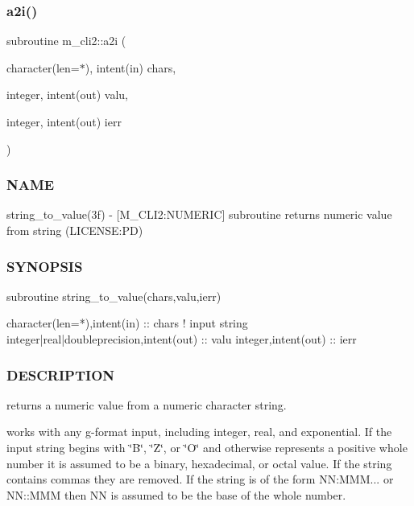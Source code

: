 \subsubsection{\texorpdfstring{a2i()}{a2i()}}
{\footnotesize\ttfamily subroutine m\+\_\+cli2\+::a2i (\begin{DoxyParamCaption}\item[{character(len=$\ast$), intent(in)}]{chars,  }\item[{integer, intent(out)}]{valu,  }\item[{integer, intent(out)}]{ierr }\end{DoxyParamCaption})\hspace{0.3cm}{\ttfamily [private]}}



\subsubsection*{N\+A\+ME}

string\+\_\+to\+\_\+value(3f) -\/ \mbox{[}M\+\_\+\+C\+L\+I2\+:N\+U\+M\+E\+R\+IC\mbox{]} subroutine returns numeric value from string (L\+I\+C\+E\+N\+SE\+:PD) 

\subsubsection*{S\+Y\+N\+O\+P\+S\+IS}

\begin{DoxyVerb}subroutine string_to_value(chars,valu,ierr)

 character(len=*),intent(in)              :: chars   ! input string
 integer|real|doubleprecision,intent(out) :: valu
 integer,intent(out)                      :: ierr
\end{DoxyVerb}
 \subsubsection*{D\+E\+S\+C\+R\+I\+P\+T\+I\+ON}

returns a numeric value from a numeric character string.

works with any g-\/format input, including integer, real, and exponential. If the input string begins with \char`\"{}\+B\char`\"{}, \char`\"{}\+Z\char`\"{}, or \char`\"{}\+O\char`\"{} and otherwise represents a positive whole number it is assumed to be a binary, hexadecimal, or octal value. If the string contains commas they are removed. If the string is of the form NN\+:M\+MM... or N\+N\+::\+M\+MM then NN is assumed to be the base of the whole number.

